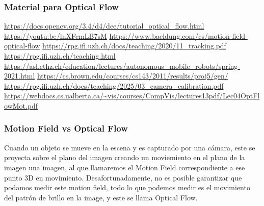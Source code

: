   \begin{frame}
  \frametitle{Material para Optical Flow}
  
  \url{https://docs.opencv.org/3.4/d4/dee/tutorial_optical_flow.html}
  \url{https://youtu.be/lnXFcmLB7sM}
  \url{https://www.baeldung.com/cs/motion-field-optical-flow}
  \url{https://rpg.ifi.uzh.ch/docs/teaching/2020/11_tracking.pdf}
  \url{https://rpg.ifi.uzh.ch/teaching.html}
  \url{https://asl.ethz.ch/education/lectures/autonomous_mobile_robots/spring-2021.html}
  \url{https://cs.brown.edu/courses/cs143/2011/results/proj5/gen/}
  \url{https://rpg.ifi.uzh.ch/docs/teaching/2025/03_camera_calibration.pdf}
  \url{https://webdocs.cs.ualberta.ca/~vis/courses/CompVis/lectures13pdf/Lec04OptFlowMot.pdf}

\end{frame}

\begin{frame}
  \frametitle{Motion Field vs Optical Flow}
  Cuando un objeto se mueve en la escena y es capturado por una cámara, este se proyecta sobre el plano del imagen creando un moviemiento en el plano de la imagen una imagen, al que llamaremos el Motion Field correspondiente a ese punto 3D en movimiento. Desafortunadamente, no es posible garantizar que podamos medir este motion field, todo lo que podemos medir es el movimiento del patrón de brillo en la image, y este se llama Optical Flow.

\end{frame}

